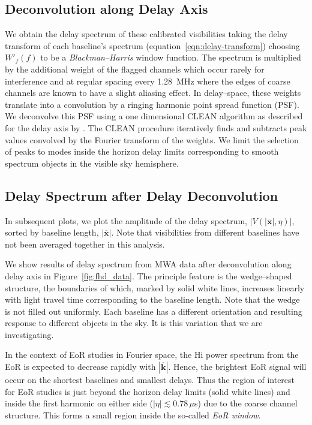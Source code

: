 \documentclass[preprint2,iop,numberedappendix]{emulateapj}
\begin{document}
\subsection{Deconvolution along Delay Axis}\label{sec:CLEAN}

We obtain the delay spectrum of these calibrated visibilities taking the delay transform of each baseline's spectrum (equation~\ref{eqn:delay-transform}) choosing $W'_f(f)$ to be a {\it Blackman--Harris} window function. The spectrum is multiplied by  the additional weight of the flagged channels which occur rarely for interference and at regular spacing every 1.28~MHz where the edges of coarse channels are known to have a slight aliasing effect. In delay--space, these weights translate into a convolution by a ringing harmonic point spread function (PSF). We deconvolve this PSF using a one dimensional CLEAN algorithm \citep{tay99} as described for the delay axis by \citet{par09,par12}. The CLEAN procedure iteratively finds and subtracts peak values convolved by the Fourier transform of the weights. We limit the selection of peaks to modes inside the horizon delay limits corresponding to smooth spectrum objects in the visible sky hemisphere.

\subsection{Delay Spectrum after Delay Deconvolution}\label{sec:data-delay-spectrum}

In subsequent plots, we plot the amplitude of the delay spectrum, $|V(|\overline{\mathbf{x}}|,\eta)|$, sorted by baseline length, $|\overline{\mathbf{x}}|$. Note that visibilities from different baselines have not been averaged together in this analysis. 

We show results of delay spectrum from MWA data after deconvolution along delay axis in Figure~\ref{fig:fhd_data}. The principle feature is the wedge--shaped structure, the boundaries of which, marked by solid white lines, increases linearly with light travel time corresponding to the baseline length. Note that the wedge is not filled out uniformly. Each baseline has a different orientation and resulting response to different objects in the sky. It is this variation that we are investigating. 

In the context of EoR studies in Fourier space, the H{\sc i} power spectrum from the EoR is expected to decrease rapidly with $|\overline{\mathbf{k}}|$. Hence, the brightest EoR signal will occur on the shortest baselines and smallest delays. Thus the region of interest for EoR studies is just beyond the horizon delay limits (solid white lines) and inside the first harmonic on either side ($|\eta| \lesssim 0.78\,\mu$s) due to the coarse channel structure. This forms a small region inside the so-called {\it EoR window}. 
\end{document}
